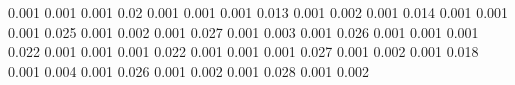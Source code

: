 0.001      0.001      %
0.001      0.02       %
0.001      0.001      %
0.001      0.013      %
0.001      0.002      %
0.001      0.014      %
0.001      0.001      %
0.001      0.025      %
0.001      0.002      %
0.001      0.027      %
0.001      0.003      %
0.001      0.026      %
0.001      0.001      %
0.001      0.022      %
0.001      0.001      %
0.001      0.022      %
0.001      0.001      %
0.001      0.027      %
0.001      0.002      %
0.001      0.018      %
0.001      0.004      %
0.001      0.026      %
0.001      0.002      %
0.001      0.028      %
0.001      0.002      %
